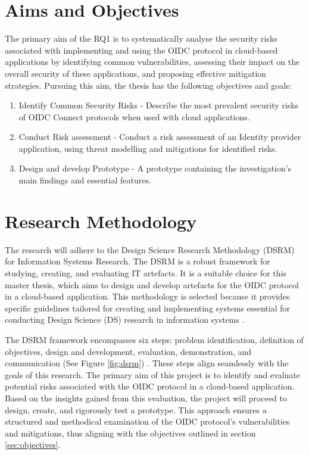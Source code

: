 \section{Aims and Objectives}
The primary aim of the RQ1 is to systematically analyse the security risks associated with implementing and using the OIDC protocol in cloud-based applications by identifying common vulnerabilities, assessing their impact on the overall security of these applications, and proposing effective mitigation strategies. Pursuing this aim, the thesis has the following objectives and goals:

\begin{enumerate}
  \item Identify Common Security Risks - Describe the most prevalent security risks of OIDC Connect protocols when used with cloud applications.
  \item Conduct Risk assessment  - Conduct a risk assessment of an Identity provider application, using threat modelling and mitigations for identified risks.
  \item Design and develop Prototype - A prototype containing the investigation's main findings and essential features.
\end{enumerate}

\section{Research Methodology}
The research will adhere to the Design Science Research Methodology (DSRM) for Information Systems Research. The DSRM is a robust framework for studying, creating, and evaluating IT artefacts. It is a suitable choice for this master thesis, which aims to design and develop artefacts for the OIDC protocol in a cloud-based application. This methodology is selected because it provides specific guidelines tailored for creating and implementing systems essential for conducting Design Science (DS) research in information systems \citep{dsrm}.

The DSRM framework encompasses six steps: problem identification, definition of objectives, design and development, evaluation, demonstration, and communication (See Figure \ref{fig:dsrm}) \citep{dsrm}. These steps align seamlessly with the goals of this research. The primary aim of this project is to identify and evaluate potential risks associated with the OIDC protocol in a cloud-based application. Based on the insights gained from this evaluation, the project will proceed to design, create, and rigorously test a prototype. This approach ensures a structured and methodical examination of the OIDC protocol’s vulnerabilities and mitigations, thus aligning with the objectives outlined in section \ref{sec:objectives}.

